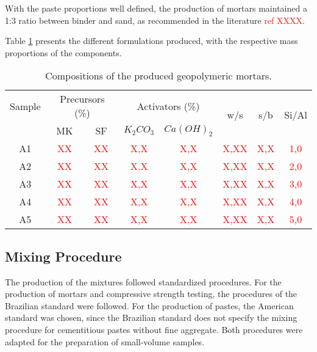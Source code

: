 With the paste proportions well defined, the production of mortars maintained a 1:3 ratio between binder and sand, as recommended in the literature \textcolor{red}{ref XXXX}.

Table \ref{tab:mortar_compositions} presents the different formulations produced, with the respective mass proportions of the components.

\begin{table}[H]
    \caption{Compositions of the produced geopolymeric mortars.}
    \label{tab:mortar_compositions}
    \center
    \begin{tabular}{cccccccc}
    \hline
    Sample & \multicolumn{2}{c}{Precursors (\%)} & \multicolumn{2}{c}{Activators (\%)} & \multirow{2}{*}{w/s} & \multirow{2}{*}{s/b} & \multirow{2}{*}{Si/Al} \\
    \cline{2-5}
     & MK & SF & $K_2CO_3$ & $Ca(OH)_2$ & & & \\
    \hline
    A1 & \textcolor{red}{XX} & \textcolor{red}{XX} & \textcolor{red}{X,X} & \textcolor{red}{X,X} & \textcolor{red}{X,XX} & \textcolor{red}{X,X} & \textcolor{red}{1,0} \\
    A2 & \textcolor{red}{XX} & \textcolor{red}{XX} & \textcolor{red}{X,X} & \textcolor{red}{X,X} & \textcolor{red}{X,XX} & \textcolor{red}{X,X} & \textcolor{red}{2,0} \\
    A3 & \textcolor{red}{XX} & \textcolor{red}{XX} & \textcolor{red}{X,X} & \textcolor{red}{X,X} & \textcolor{red}{X,XX} & \textcolor{red}{X,X} & \textcolor{red}{3,0} \\
    A4 & \textcolor{red}{XX} & \textcolor{red}{XX} & \textcolor{red}{X,X} & \textcolor{red}{X,X} & \textcolor{red}{X,XX} & \textcolor{red}{X,X} & \textcolor{red}{4,0} \\
    A5 & \textcolor{red}{XX} & \textcolor{red}{XX} & \textcolor{red}{X,X} & \textcolor{red}{X,X} & \textcolor{red}{X,XX} & \textcolor{red}{X,X} & \textcolor{red}{5,0} \\
    \hline
    \end{tabular}
\end{table}

\subsection{Mixing Procedure}
\label{subsec:mixing_procedure}

The production of the mixtures followed standardized procedures. For the production of mortars and compressive strength testing, the procedures of the Brazilian standard \cite{ABNT_NBR_7215_2019} were followed. For the production of pastes, the American standard \cite{ASTM_C305_2006} was chosen, since the Brazilian standard does not specify the mixing procedure for cementitious pastes without fine aggregate. Both procedures were adapted for the preparation of small-volume samples.

